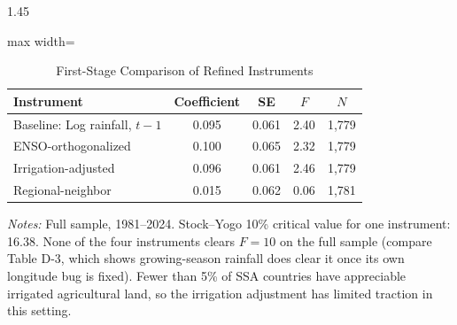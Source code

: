 \documentclass[12pt]{article}
\begin{document}
\begin{bibunit}[jpe]
\begin{spacing}{1.45}
\begin{table}[H]
\centering
\begin{adjustbox}{max width=\textwidth}
\begin{threeparttable}
\caption{First-Stage Comparison of Refined Instruments}
\label{tab:D7}
\begin{tabular}{lcccc}
\toprule
Instrument & Coefficient & SE & $F$ & $N$ \\
\midrule
Baseline: Log rainfall, $t-1$ & 0.095 & 0.061 & 2.40 & 1{,}779 \\
ENSO-orthogonalized           & 0.100 & 0.065 & 2.32 & 1{,}779 \\
Irrigation-adjusted           & 0.096 & 0.061 & 2.46 & 1{,}779 \\
Regional-neighbor             & 0.015 & 0.062 & 0.06 & 1{,}781 \\
\bottomrule
\end{tabular}
\begin{tablenotes}[flushleft]
\footnotesize
\item \textit{Notes:} Full sample, 1981--2024. Stock--Yogo 10\% critical value for one instrument: 16.38. None of the four instruments clears $F=10$ on the full sample (compare Table D-3, which shows growing-season rainfall does clear it once its own longitude bug is fixed). Fewer than 5\% of SSA countries have appreciable irrigated agricultural land, so the irrigation adjustment has limited traction in this setting.
\end{tablenotes}
\end{threeparttable}
\end{adjustbox}
\end{table}


\end{spacing}
\end{bibunit}
\end{document}
